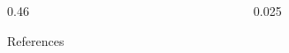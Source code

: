 \documentclass{beamer}
\begin{document}
\begin{frame}[t]
\begin{columns}[t]
\begin{column}{0.46\paperwidth}
\begin{block}{References}
      \end{block}
    \end{column}
    
    \begin{column}{0.025\paperwidth}\end{column} 
  \end{columns}
\end{frame}
\end{document}
